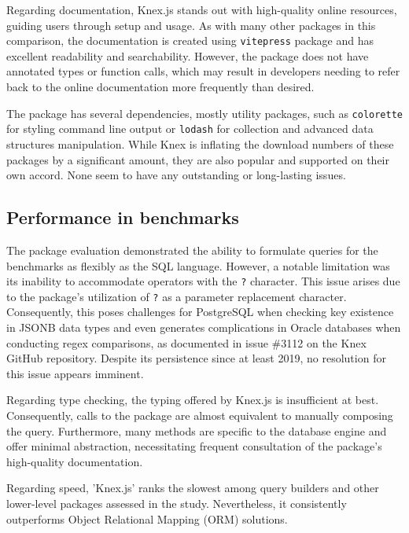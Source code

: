 Regarding documentation, Knex.js stands out with high-quality online resources,
guiding users through setup and usage. As with many other packages in this
comparison, the documentation is created using \texttt{vitepress} package and
has excellent readability and searchability. However, the package does not have
annotated types or function calls, which may result in developers needing to
refer back to the online documentation more frequently than desired.

The package has several dependencies, mostly utility packages, such as
\texttt{colorette} for styling command line output or \texttt{lodash} for
collection and advanced data structures manipulation. While Knex is inflating
the download numbers of these packages by a significant amount, they are also
popular and supported on their own accord. None seem to have any outstanding or
long-lasting issues.

\subsection{Performance in benchmarks}

The package evaluation demonstrated the ability to formulate queries for the
benchmarks as flexibly as the SQL language. However, a notable limitation was
its inability to accommodate operators with the \texttt{?} character. This issue
arises due to the package's utilization of \texttt{?} as a parameter replacement
character. Consequently, this poses challenges for PostgreSQL when checking key
existence in JSONB data types and even generates complications in Oracle
databases when conducting regex comparisons, as documented in issue \#3112 on
the Knex GitHub repository. Despite its persistence since at least 2019, no
resolution for this issue appears imminent.

Regarding type checking, the typing offered by Knex.js is insufficient at best.
Consequently, calls to the package are almost equivalent to manually composing
the query. Furthermore, many methods are specific to the database engine and
offer minimal abstraction, necessitating frequent consultation of the package's
high-quality documentation.

Regarding speed, 'Knex.js' ranks the slowest among query builders and other
lower-level packages assessed in the study. Nevertheless, it consistently
outperforms Object Relational Mapping (ORM) solutions.
